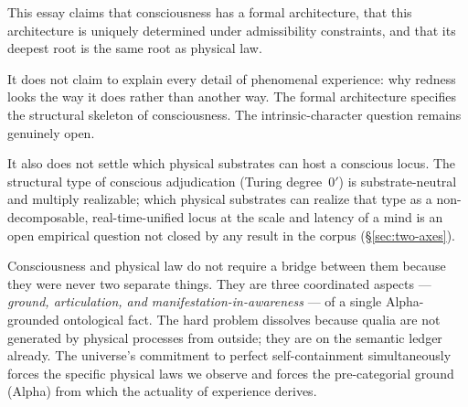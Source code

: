 \documentclass[11pt]{article}
\theoremstyle{remark}
\begin{document}
This essay claims that consciousness has a formal architecture, that this architecture
is uniquely determined under admissibility constraints, and that its deepest root is
the same root as physical law.

It does not claim to explain every detail of phenomenal experience: why redness looks
the way it does rather than another way. The formal architecture specifies the structural
skeleton of consciousness. The intrinsic-character question remains genuinely open.

It also does not settle which physical substrates can host a conscious locus.
The structural type of conscious adjudication (Turing degree~$0'$) is
substrate-neutral and multiply realizable; which physical substrates can realize that
type as a non-decomposable, real-time-unified locus at the scale and latency of a mind
is an open empirical question not closed by any result in the corpus
(\S\ref{sec:two-axes}).

\begin{tcolorbox}[colback=blue!5,colframe=blue!40!black,title={Central Thesis}]
Consciousness and physical law do not require a bridge between them because they were
never two separate things. They are three coordinated aspects --- \emph{ground,
articulation, and manifestation-in-awareness} --- of a single Alpha-grounded ontological
fact. The hard problem dissolves because qualia are not generated by physical processes
from outside; they are on the semantic ledger already. The universe's commitment to
perfect self-containment simultaneously forces the specific physical laws we observe
and forces the pre-categorial ground (Alpha) from which the actuality of experience
derives.
\end{tcolorbox}
\end{document}
